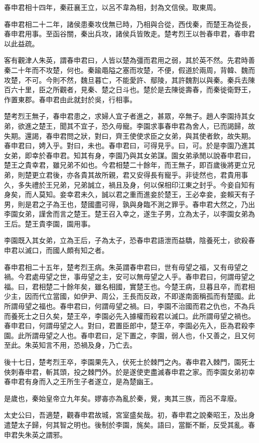 春申君相十四年，秦莊襄王立，以呂不韋為相，封為文信侯。取東周。

春申君相二十二年，諸侯患秦攻伐無已時，乃相與合從，西伐秦，而楚王為從長，春申君用事。至函谷關，秦出兵攻，諸侯兵皆敗走。楚考烈王以咎春申君，春申君以此益疏。

客有觀津人朱英，謂春申君曰，人皆以楚為彊而君用之弱，其於英不然。先君時善秦二十年而不攻楚，何也。秦踰黽隘之塞而攻楚，不便，假道於兩周，背韓、魏而攻楚，不可。今則不然，魏旦暮亡，不能愛許、鄢陵，其許魏割以與秦。秦兵去陳百六十里，臣之所觀者，見秦、楚之日斗也。楚於是去陳徙壽春，而秦徙衛野王，作置東郡。春申君由此就封於吳，行相事。

楚考烈王無子，春申君患之，求婦人宜子者進之，甚眾，卒無子。趙人李園持其女弟，欲進之楚王，聞其不宜子，恐久毋寵。李園求事春申君為舍人，已而謁歸，故失期。還謁，春申君問之狀，對曰，齊王使使求臣之女弟，與其使者飲，故失期。春申君曰，娉入乎。對曰，未也。春申君曰，可得見乎。曰，可。於是李園乃進其女弟，即幸於春申君。知其有身，李園乃與其女弟謀。園女弟承閒以說春申君曰，楚王之貴幸君，雖兄弟不如也。今君相楚二十餘年，而王無子，即百歲後將更立兄弟，則楚更立君後，亦各貴其故所親，君又安得長有寵乎。非徒然也，君貴用事久，多失禮於王兄弟，兄弟誠立，禍且及身，何以保相印江東之封乎。今妾自知有身矣，而人莫知。妾幸君未久，誠以君之重而進妾於楚王，王必幸妾，妾賴天有子男，則是君之子為王也，楚國盡可得，孰與身臨不測之罪乎。春申君大然之，乃出李園女弟，謹舍而言之楚王。楚王召入幸之，遂生子男，立為太子，以李園女弟為王后。楚王貴李園，園用事。

李園既入其女弟，立為王后，子為太子，恐春申君語泄而益驕，陰養死士，欲殺春申君以滅口，而國人頗有知之者。

春申君相二十五年，楚考烈王病。朱英謂春申君曰，世有毋望之福，又有毋望之禍。今君處毋望之世，事毋望之主，安可以無毋望之人乎。春申君曰，何謂毋望之福。曰，君相楚二十餘年矣，雖名相國，實楚王也。今楚王病，旦暮且卒，而君相少主，因而代立當國，如伊尹、周公，王長而反政，不即遂南面稱孤而有楚國。此所謂毋望之福也。春申君曰，何謂毋望之禍。曰，李園不治國而君之仇也，不為兵而養死士之日久矣，楚王卒，李園必先入據權而殺君以滅口。此所謂毋望之禍也。春申君曰，何謂毋望之人。對曰，君置臣郎中，楚王卒，李園必先入，臣為君殺李園。此所謂毋望之人也。春申君曰，足下置之，李園，弱人也，仆又善之，且又何至此。朱英知言不用，恐禍及身，乃亡去。

後十七日，楚考烈王卒，李園果先入，伏死士於棘門之內。春申君入棘門，園死士俠刺春申君，斬其頭，投之棘門外。於是遂使吏盡滅春申君之家。而李園女弟初幸春申君有身而入之王所生子者遂立，是為楚幽王。

是歲也，秦始皇帝立九年矣。嫪毐亦為亂於秦，覺，夷其三族，而呂不韋廢。

太史公曰，吾適楚，觀春申君故城，宮室盛矣哉。初，春申君之說秦昭王，及出身遣楚太子歸，何其智之明也。後制於李園，旄矣。語曰，當斷不斷，反受其亂。春申君失朱英之謂邪。